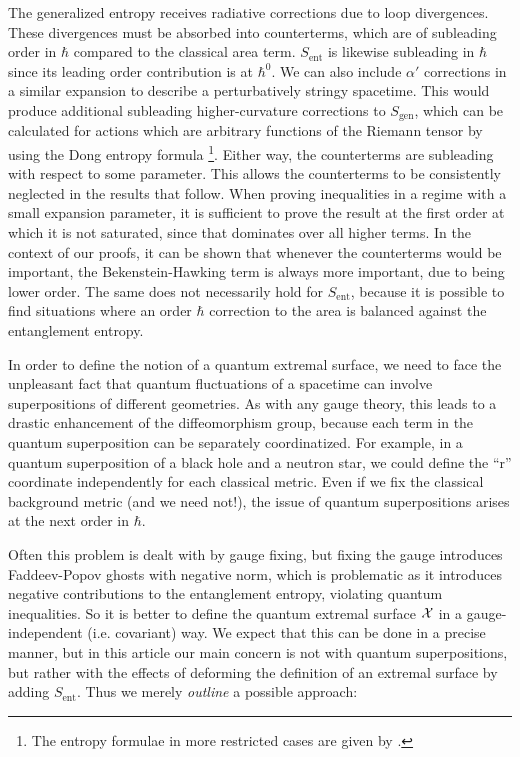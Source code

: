 \documentclass[12pt]{article}
\theoremstyle{remark}
\numberwithin{equation}{section}
\numberwithin{equation}{section}
\begin{document}
The generalized entropy receives radiative corrections due to loop divergences.  These divergences must be absorbed into counterterms, which are of subleading order in $\hbar$ compared to the classical area term.  $S_{\text{ent}}$ is likewise subleading in $\hbar$ since its leading order contribution is at $\hbar^0$.  We can also include $\alpha'$ corrections in a similar expansion to describe a perturbatively stringy spacetime.  This would produce additional subleading higher-curvature corrections to $S_{\text{gen}}$,  which can be calculated for actions which are arbitrary functions of the Riemann tensor by using the Dong entropy formula \cite{Dong}\footnote{The entropy formulae in more restricted cases are given by \cite{Sarkar:2013swa, Fursaev:2013fta, Camps:2013zua, Bhattacharyya:2013gra, Bhattacharyya:2014yga}.}.  Either way, the counterterms are subleading with respect to some parameter.  This allows the counterterms to be consistently neglected in the results that follow.  When proving inequalities in a regime with a small expansion parameter, it is sufficient to prove the result at the first  order at which it is not saturated, since that dominates over all higher terms.  In the context of our proofs, it can be shown \cite{Wall12} that whenever the counterterms would be important, the Bekenstein-Hawking term is always more important, due to being lower order.  The same does not necessarily hold for $S_\mathrm{ent}$, because it is possible to find situations where an order $\hbar$ correction to the area is balanced against the entanglement entropy.

In order to define the notion of a quantum extremal surface, we need to face the unpleasant fact that quantum fluctuations of a spacetime can involve superpositions of different geometries.  As with any gauge theory, this leads to a drastic enhancement of the diffeomorphism group, because each term in the quantum superposition can be separately coordinatized.  For example, in a quantum superposition of a black hole and a neutron star, we could define the ``r'' coordinate independently for each classical metric.  Even if we fix the classical background metric (and we need not!), the issue of quantum superpositions arises at the next order in $\hbar$.  

Often this problem is dealt with by gauge fixing, but fixing the gauge introduces Faddeev-Popov ghosts with negative norm, which is problematic as it introduces negative contributions to the entanglement entropy, violating quantum inequalities.  So it is better to define the quantum extremal surface ${\cal X}$ in a gauge-independent (i.e. covariant) way.  We expect that this can be done in a precise manner, but in this article our main concern is not with quantum superpositions, but rather with the effects of deforming the definition of an extremal surface by adding $S_\mathrm{ent}$.  Thus we merely \emph{outline} a possible approach:
\end{document}
